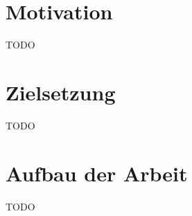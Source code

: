 \pagestyle{fancy-style}

\section{Motivation}
TODO

\section{Zielsetzung}
TODO
   
\section{Aufbau der Arbeit}
TODO


